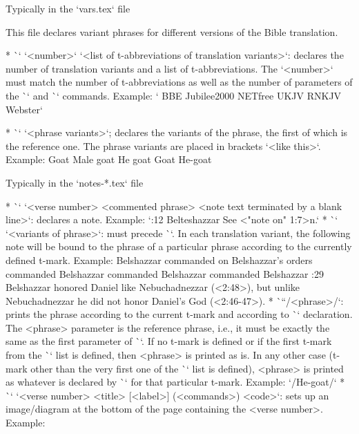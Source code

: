 {{\secc Typically in the `vars.tex` file

This file declares variant phrases for different versions of the Bible translation.

\begitems
* \`\variants` `<number>` `<list of t-abbreviations of translation variants>`: declares the number of
  translation variants and a list of \hbox{t-abbreviations}. The `<number>` must match the number of
  t-abbreviations as well as the number of parameters of the \`\vdef` and \`\ww` commands.
Example: 
` {BBE} {Jubilee2000} {NETfree} {UKJV} {RNKJV} {Webster}` 
  
* \`\vdef` `<phrase variants>`; declares the variants of the phrase, the first of which is
 the reference one. The phrase variants are placed in brackets `{<like this>}`.
 Example: 
 \begtt
       {Goat}      %
       {Male goat} %
       {He goat}   %
       {Goat}      %
       {He-goat}   %
\endtt      
\enditems

\secc Typically in the `notes-*.tex` file

\begitems
* \`\Note` `<verse number> {<commented phrase>} <note text terminated by a blank line>`:
  declares a note. Example:   `:12 {Belteshazzar} See <"note on" 1:7>n.`  
* \`\ww` `<variants of phrase>`: must precede \`\Note`. In
  each translation variant, the following note will be bound to the phrase
  of a particular phrase according to the currently defined t-mark.
 Example:
\begtt
{} %
    {Belshazzar commanded}       %
    {on Belshazzar's orders}     %
    {commanded Belshazzar}       %
    {commanded Belshazzar}       %
    {commanded Belshazzar}       %
 :29 {}  Belshazzar honored Daniel like Nebuchadnezzar (<2:48>),  
       but unlike Nebuchadnezzar he did not honor Daniel's God (<2:46-47>).    
\endtt
* \`\x``/<phrase>/`: prints the phrase according to the current t-mark and according to   \`\vdef` 
declaration. 
  The <phrase> parameter is the reference phrase, i.e., it must be exactly the same as the first 
  parameter of \`\vdef`.
    If no t-mark is defined or if the first t-mark from the \`\variants` list is defined, then 
  <phrase> is printed as is. In any other case (t-mark other than the very first one of the 
  \`\variants` list is defined),  <phrase> is printed as whatever is declared by \`\vdef` for that 
  particular t-mark.
  Example: `\x/He-goat/`
* \`\putBot` `<verse number> {<title>} [<label>] (<commands>) {<code>}`:
  sets up an image/diagram at the bottom of the page containing the <verse number>.   
  Example: 
  
}}
